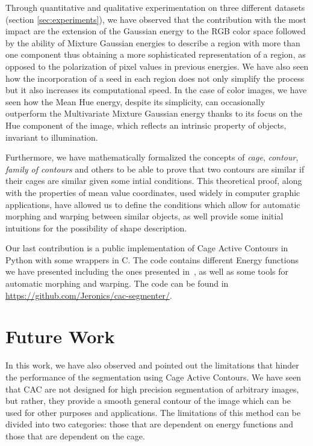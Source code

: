 Through quantitative and qualitative experimentation on three different datasets (section \ref{sec:experiments}), we have observed that the contribution with the most impact are the extension of the Gaussian energy to the RGB color space followed by the ability of Mixture Gaussian energies to describe a region with more than one component thus obtaining a more sophisticated representation of a region, as opposed to the polarization of pixel values in previous energies. We have also seen how the incorporation of a seed in each region does not only simplify the process but it also increases its computational speed. In the case of color images, we have seen how the Mean Hue energy, despite its simplicity, can occasionally outperform the Multivariate Mixture Gaussian energy thanks to its focus on the Hue component of the image, which reflects an intrinsic property of objects, invariant to illumination.

Furthermore, we have mathematically formalized the concepts of \textit{cage}, \textit{contour}, \textit{family of contours} and others to be able to prove that two contours are similar if their cages are similar given some intial conditions. This theoretical proof, along with the properties of mean value coordinates, used widely in computer graphic applications, have allowed us to define the conditions which allow for automatic morphing and warping between similar objects, as well provide some initial intuitions for the possibility of shape description.

Our last contribution is a public implementation of Cage Active Contours in Python with some wrappers in C. The code contains different Energy functions we have presented including the ones presented  in~\cite{ipcac2015}, as well as some tools for automatic morphing and warping. The code can be found in \url{https://github.com/Jeronics/cac-segmenter/}.


\section{Future Work}
In this work, we have also observed and pointed out the limitations that hinder the performance of the segmentation using Cage Active Contours. We have seen that CAC are not designed for high precision segmentation of arbitrary images, but rather, they provide a smooth general contour of the image which can be used for other purposes and applications. The limitations of this method can be divided into two categories: those that are dependent on energy functions and those that are dependent on the cage. 

